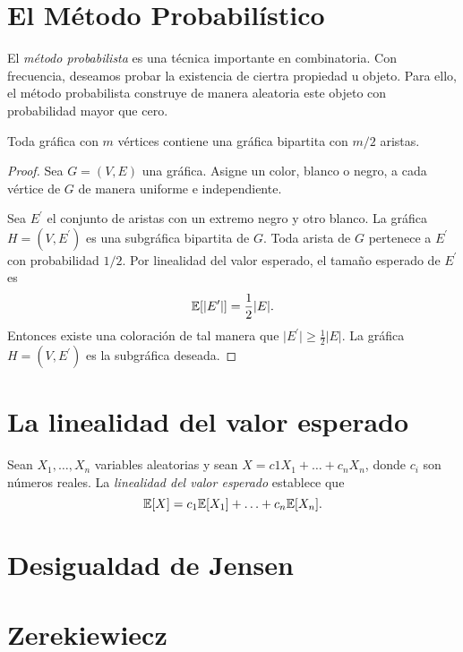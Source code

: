 \section{El Método Probabilístico}
El \textit{método probabilista} es una técnica importante en
combinatoria. Con frecuencia, deseamos probar la existencia de
ciertra propiedad u objeto. Para ello, el método probabilista construye
de manera aleatoria este objeto con probabilidad mayor que cero.

\begin{theorem}
  Toda gráfica con $m$ vértices contiene una gráfica bipartita con $m
  / 2$ aristas.
\end{theorem}

\begin{proof}
  Sea $G = (V, E)$ una gráfica. Asigne un color, blanco o negro, a
  cada vértice de $G$  de manera uniforme e independiente.

  Sea $E^\prime$ el conjunto de aristas con un extremo negro y otro
  blanco. La gráfica $H = (V, E^\prime)$ es una subgráfica bipartita de $G$.
  Toda arista de $G$ pertenece a $E^\prime$ con probabilidad $1/2$.
  Por linealidad del valor esperado, el tamaño esperado de $E^\prime$ es
  $$\mathbb{E}[\vert E^\prime \vert] = \frac{1}{2} \vert E \vert.$$
  Entonces existe una coloración de tal manera que $\vert E^\prime
  \vert \ge \frac{1}{2}\vert E \vert$. La gráfica $H = (V, E^\prime)$
  es la subgráfica deseada.
\end{proof}

\section{La linealidad del valor esperado}
Sean $X_1, \ldots, X_n$ variables aleatorias y sean $X = c1 X_1 + \ldots + c_n X_n$, donde $c_i$ son números reales. La \textit{linealidad del valor esperado} establece que 
$$ \mathbb{E}[X] = c_1 \mathbb{E}[X_1] + \ldots + c_n \mathbb{E}[X_n]. $$
\section{Desigualdad de Jensen}

\section{Zerekiewiecz}


